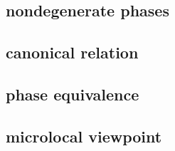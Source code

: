

\subsection{nondegenerate phases}
\label{b2:subsec:210501}

\subsection{canonical relation}
\label{b2:subsec:210502}

\subsection{phase equivalence}
\label{b2:subsec:210503}

\subsection{microlocal viewpoint}
\label{b2:subsec:210504}


